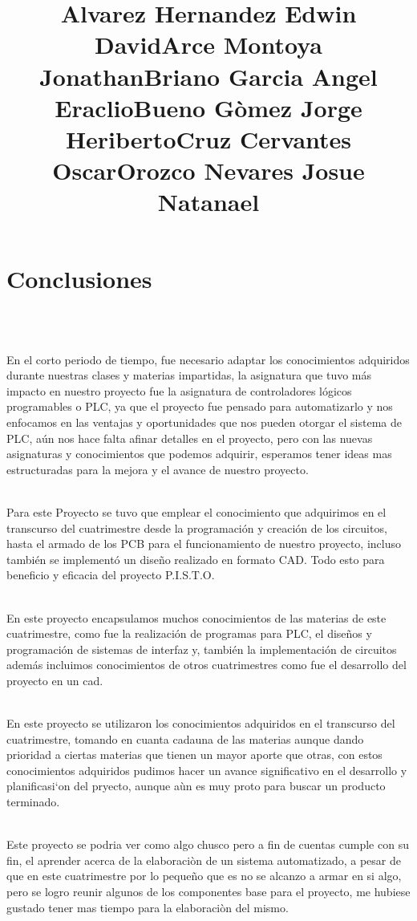 \documentclass[12pt,a4paper]{article}
\begin{document}
\section{Conclusiones}
\title{\textbf{Alvarez Hernandez Edwin David}}\\

\title{\textbf{Arce Montoya Jonathan}}\\
En el corto periodo de tiempo, fue necesario adaptar los conocimientos adquiridos durante nuestras clases y materias impartidas, la asignatura que tuvo más impacto en nuestro proyecto fue la asignatura de controladores lógicos programables o PLC, ya que el proyecto fue pensado para automatizarlo y nos enfocamos en las ventajas y oportunidades que nos pueden otorgar el sistema de PLC, aún nos hace falta afinar detalles en el proyecto, pero con las nuevas asignaturas y conocimientos que podemos adquirir, esperamos tener ideas mas estructuradas para la mejora y el avance de nuestro proyecto.\\
\title{\textbf{Briano Garcia Angel Eraclio}}\\
Para este Proyecto se tuvo que emplear el conocimiento que adquirimos en el transcurso del cuatrimestre desde la programación y creación de los circuitos, hasta el armado de los 
PCB para el funcionamiento de nuestro proyecto, incluso también se implementó un diseño realizado en formato CAD. Todo esto para beneficio y eficacia del proyecto P.I.S.T.O.\\ 
\title{\textbf{Bueno Gòmez Jorge Heriberto}}\\
En este proyecto encapsulamos muchos conocimientos de las materias de este cuatrimestre, 
como fue la realización de programas para PLC, el diseños y programación de sistemas de interfaz y, también la implementación de circuitos además incluimos conocimientos de otros cuatrimestres como fue el desarrollo del proyecto en un cad.\\
\title{\textbf{Cruz Cervantes Oscar}}\\
En este proyecto se utilizaron los conocimientos adquiridos en el transcurso del cuatrimestre, tomando en cuanta cadauna de las materias aunque dando prioridad a ciertas materias que tienen un mayor aporte que otras, con estos conocimientos adquiridos pudimos hacer un avance significativo en el desarrollo y planificasi`on del pryecto, aunque aùn es muy proto para buscar un producto terminado. \\
\title{\textbf{Orozco Nevares Josue Natanael}}\\
Este proyecto se podria ver como algo chusco pero a fin de cuentas cumple con su fin, el aprender acerca de la elaboraciòn de un sistema automatizado, a pesar de que en este cuatrimestre por lo pequeño que es no se alcanzo a armar en si algo, pero se logro reunir algunos de los componentes base para el proyecto, me hubiese gustado tener mas tiempo para la elaboraciòn del mismo. 
\newpage
\nocite{*}


\end{document}
